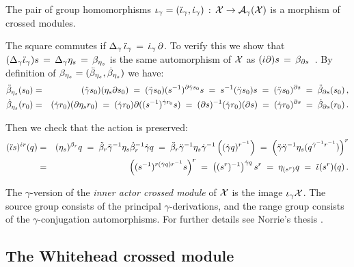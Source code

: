 \begin{thm} \label{thm:iota}
The pair of group homomorphisms  
$\iota_{\gamma} = (\ddot{\iota}_{\gamma},\dot{\iota}_{\gamma}) 
 \,:\,  \mathcal{X} \to \mathcal{A}_{\gamma}(\mathcal{X})$
is a morphism of crossed modules.
\end{thm}
\begin{pf}
The square commutes if 
$\Delta_{\gamma}\,\ddot{\iota}_{\gamma} \,=\, \dot{\iota}_{\gamma}\,\partial$. 
To verify this we show that
$(\Delta_{\gamma}\ddot{\iota}_{\gamma})s \,=\, \Delta_{\gamma}\eta_s 
                                 \,=\, \beta_{\eta_s}$
is the same automorphism of  $\mathcal{X}$  as
$(\dot{\iota}\partial)s \,=\, \beta_{\partial s}$~. 
By definition of  $\beta_{\eta_s} = (\ddot{\beta}_{\eta_s},\dot{\beta}_{\eta_s})$  we have: 
\begin{eqnarray*}
\ddot{\beta}_{\eta_s}(s_0) 
  & = & (\ddot{\gamma} s_0)(\eta_s\partial s_0) 
  \;=\; (\ddot{\gamma} s_0)(s^{-1})^{\partial \ddot{\gamma} s_0}s
  \;=\; s^{-1}(\ddot{\gamma} s_0)s 
  \;=\; (\ddot{\gamma} s_0)^{\partial s} 
  \;=\; \ddot{\beta}_{\partial s}(s_0) \,, \\
\dot{\beta}_{\eta_s}(r_0) 
  & = & (\dot{\gamma} r_0)(\partial\eta_s r_0) 
  \;=\; (\dot{\gamma} r_0) \partial((s^{-1})^{\dot{\gamma} r_0}s)
  \;=\; (\partial s)^{-1}(\dot{\gamma} r_0)(\partial s) 
  \;=\; (\dot{\gamma} r_0)^{\partial s} 
  \;=\; \dot{\beta}_{\partial s}(r_0) \,. 
\end{eqnarray*}

\noindent
Then we check that the action is preserved:
\begin{eqnarray*} 
(\ddot{\iota} s)^{\dot{\iota} r}(q) 
  & = &  (\eta_s)^{\beta_r}q 
  \;=\;  \ddot{\beta}_r \ddot{\gamma}^{-1} \eta_s \dot{\beta}_r^{-1} \dot{\gamma} q 
  \;=\;  \ddot{\beta}_r \ddot{\gamma}^{-1} \eta_s \dot{\gamma}^{-1} \left( (\dot{\gamma} q)^{r^{-1}} \right) 
  \;=\;  \left( \ddot{\gamma} \ddot{\gamma}^{-1} \eta_s ( q^{\dot{\gamma}^{-1}r^{-1}} ) \right)^r \\ 
  & = &  \left( (s^{-1})^{r(\dot{\gamma} q)r^{-1}} s \right)^r 
  \;=\;  \left( (s^r)^{-1} \right)^{\dot{\gamma} q} s^r 
  \;=\;  \eta_{(s^r)}q 
  \;=\;  \ddot{\iota}(s^r)(q) \,.
\end{eqnarray*} 
\end{pf}

The $\gamma$-version of the \emph{inner actor crossed module} of $\mathcal{X}$ 
is the image $\iota_{\gamma}\mathcal{X}$. 
The source group consists of the principal $\gamma$-derivations, 
and the range group consists of the $\gamma$-conjugation automorphisms. 
For further details see Norrie's thesis \cite{nor2}. 



\subsection{The Whitehead crossed module} 
\label{subs:Whitehead-xmod}


